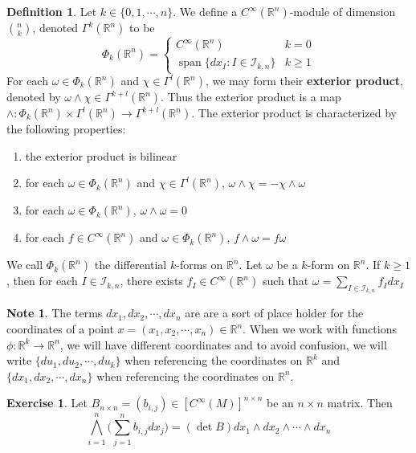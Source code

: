 \documentclass[12pt]{amsart}
\theoremstyle{definition}
\newtheorem{defn}[definition]{Definition}
\newtheorem{note}[definition]{Note}
\theoremstyle{definition}
\newtheorem{ex}[definition]{Exercise}
\newcommand{\om}{\omega}
\newcommand{\R}{\mathbb{R}}
\newcommand{\MI}{\mathcal{I}}
\DeclareMathOperator{\spn}{span}
\begin{document}
	\begin{defn}
		Let $k \in \{0, 1, \cdots, n\}$. We define a $C^{\infty}(\R^n)$-module of dimension ${n \choose k}$, denoted $\Gamma^k(\R^n)$ to be 
		\[
		\Phi_k(\R^n) =
		\begin{cases}
			C^{\infty}(\R^n) & k = 0 \\
			\spn \{ dx_I: I \in \MI_{k,n} \} & k \geq 1
		\end{cases}
		\]
		For each $\om \in \Phi_k(\R^n)$ and $\chi \in \Gamma^l(\R^n)$,   we may form their \textbf{exterior product}, denoted by $\om \wedge \chi \in \Gamma^{k+l}(\R^n)$. Thus the exterior product is a map $\wedge : \Phi_k(\R^n) \times \Gamma^l(\R^n)\rightarrow \Gamma^{k+l}(\R^n)$. The exterior product is characterized by the following properties:
		\begin{enumerate}
			\item the exterior product is bilinear
			\item for each $\om \in \Phi_k(\R^n)$ and $\chi \in \Gamma^l(\R^n)$, $\om \wedge \chi = - \chi \wedge \om$ 
			\item for each $\om \in \Phi_k(\R^n)$, $\om \wedge \om = 0$
			\item for each $f \in C^{\infty}(\R^n)$ and $ \om \in \Phi_k(\R^n)$, $f \wedge \om = f \om$
		\end{enumerate}
		We call $\Phi_k(\R^n)$ the differential $k$-forms on $\R^n$. Let $\om$ be a $k$-form on $\R^n$. If $k \geq 1$, then for each $I \in \MI_{k,n}$, there exists $f_I \in C^{\infty}(\R^n)$ such that $\om = \sum\limits_{I \in \MI_{k,n}} f_I dx_I$
	\end{defn}
	
	
	\begin{note}
		The terms $dx_1, dx_2, \cdots, dx_n$ are are a sort of place holder for the coordinates of a point $x = (x_1, x_2, \cdots, x_n) \in \R^n$. When we work with functions $\phi: \R^k \rightarrow \R^n$, we will have different coordinates and to avoid confusion, we will write $\{du_1, du_2, \cdots, du_k\}$ when referencing the coordinates on $\R^k$ and $\{dx_1, dx_2, \cdots, dx_n\}$ when referencing the coordinates on $\R^n$. 
	\end{note}

	\begin{ex}
		Let $B_{n\times n} = (b_{i,j}) \in [C^{\infty}(M)]^{n \times n}$ be an $n\times n$ matrix. Then $$\bigwedge_{i=1}^n \bigg(\sum_{j=1}^n b_{i,j}dx_j\bigg) = (\det B) dx_1 \wedge dx_2 \wedge \cdots \wedge dx_n$$
	\end{ex}
\end{document}
